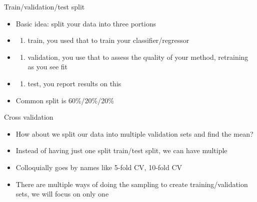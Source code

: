 \documentclass[obeyspaces,aspectratio=43]{beamer}
\renewcommand{\href}[2]{#2\footnote{\url{#1}}}
\providecommand{\tightlist}{%
  \setlength{\itemsep}{0pt}\setlength{\parskip}{0pt}}
\begin{document}
\begin{frame}{Train/validation/test split}

\begin{itemize}
\item
  Basic idea: split your data into three portions
\item
  \begin{enumerate}
  \def\labelenumi{(\alph{enumi})}
  \tightlist
  \item
    train, you used that to train your classifier/regressor
  \end{enumerate}
\item
  \begin{enumerate}
  \def\labelenumi{(\alph{enumi})}
  \setcounter{enumi}{1}
  \tightlist
  \item
    validation, you use that to assess the quality of your method,
    retraining as you see fit
  \end{enumerate}
\item
  \begin{enumerate}
  \def\labelenumi{(\alph{enumi})}
  \setcounter{enumi}{2}
  \tightlist
  \item
    test, you report results on this
  \end{enumerate}
\item
  Common split is 60\%/20\%/20\%
\end{itemize}

\end{frame}

\begin{frame}{Cross validation}

\begin{itemize}
\tightlist
\item
  How about we split our data into multiple validation sets and find the
  mean?
\item
  Instead of having just one split train/test split, we can have
  multiple
\item
  Colloquially goes by names like 5-fold CV, 10-fold CV
\item
  There are multiple ways of doing the sampling to create
  training/validation sets, we will focus on only one
\end{itemize}

\end{frame}

\begin{frame}{Pictorial depiction of 5-fold CV}

\href{https://scikit-learn.org/stable/_images/grid_search_cross_validation.png}{Copied
from SKlearns website}

\texttt{[image: ./graphics/\{grid\_search\_cross\_validation]}.png}

\end{frame}
\end{document}
